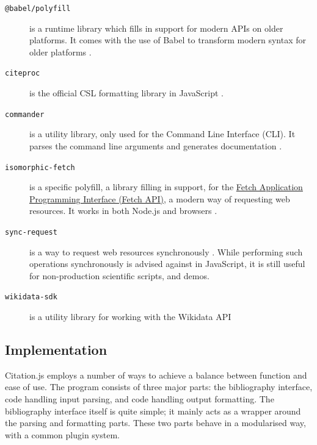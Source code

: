\documentclass[fleqn,10pt,lineno]{wlpeerj} %
\begin{document}
\begin{description}
\item[\texttt{@babel/polyfill}]
is a runtime library which fills in support for modern APIs on older platforms. It comes with the use of Babel to transform modern syntax for older platforms \citep{Zhu2018babel/babel}.

\item[\texttt{citeproc}]
is the official CSL formatting library in JavaScript \citep{Bennett2018Juris-M/citeproc-js,noauthor_csl_nodate}.

\item[\texttt{commander}]
is a utility library, only used for the Command Line Interface (CLI). It parses the command line arguments and generates documentation \citep{Holowaychuk2018tj/commander.js}.

\item[\texttt{isomorphic-fetch}]
is a specific polyfill, a library filling in support, for the \href{https://developer.mozilla.org/en-US/docs/Web/API/Fetch_API}{Fetch Application Programming Interface (Fetch API)}, a modern way of requesting web resources. It works in both Node.js and browsers \citep{Andrews2018matthew-andrews/isomorphic-fetch}.

\item[\texttt{sync-request}]
is a way to request web resources synchronously \citep{Lindesay2018ForbesLindesay/sync-request}. While performing such operations synchronously is advised against in JavaScript, it is still useful for non-production scientific scripts, and demos.

\item[\texttt{wikidata-sdk}]
is a utility library for working with the Wikidata API \citep{Lathuiliere2018maxlath/wikidata-sdk,vrandecic_wikidata:_2014}
\end{description}

\subsection*{Implementation}

Citation.js employs a number of ways to achieve a balance between function and ease of use. The program consists of three major parts: the bibliography interface, code handling input parsing, and code handling output formatting. The bibliography interface itself is quite simple; it mainly acts as a wrapper around the parsing and formatting parts. These two parts behave in a modularised way, with a common plugin system.
\end{document}
